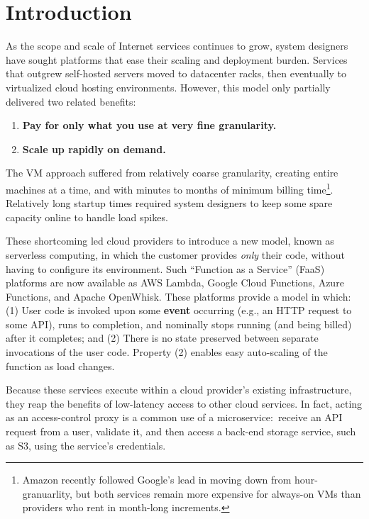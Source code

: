 \section{Introduction}
\label{sec:intro}

As the scope and scale of Internet services continues to grow, system designers
have sought platforms that ease their scaling and deployment burden.
Services that outgrew self-hosted servers moved to datacenter racks, then eventually to virtualized cloud hosting environments.
However, this model only partially delivered two related benefits:
\begin{enumerate}
\item \textbf{Pay for only what you use at very fine granularity.}
\item \textbf{Scale up rapidly on demand.}
\end{enumerate}

The VM approach suffered from relatively coarse granularity, creating entire
machines at a time, and with minutes to months of minimum billing
time\footnote{Amazon recently followed Google's lead in moving down from
  hour-granuarlity, but both services remain more expensive for always-on VMs
  than providers who rent in month-long increments.}.  Relatively long startup
times required system designers to keep some spare capacity online to handle load
spikes.

These shortcoming led cloud providers to introduce a new model, known as
serverless computing, in which the customer provides \textit{only} their code,
without having to configure its environment.   Such ``Function as a Service''
(FaaS) platforms are now available as AWS Lambda, Google Cloud Functions, Azure
Functions, and Apache OpenWhisk.  These platforms provide a model in which:
(1)  User code is invoked upon some \textbf{event} occurring (e.g., an HTTP
request to some API), runs to completion, and nominally stops running (and being
billed) after it completes; and (2)  There is no state preserved between
separate invocations of the user code.  Property (2) enables easy auto-scaling
of the function as load changes.

Because these services execute within a cloud provider's existing
infrastructure, they reap the benefits of low-latency access to other cloud
services.  In fact, acting as an access-control proxy is a common use of a
microservice:\ receive an API request from a user, validate it, and then access
a back-end storage service, such as S3, using the service's credentials.

